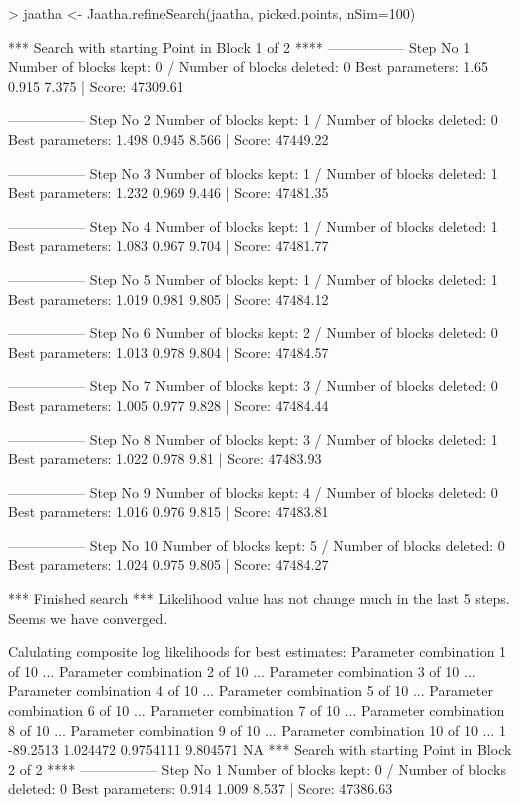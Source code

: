 
\begin{Schunk}
\begin{Sinput}
> jaatha <- Jaatha.refineSearch(jaatha, picked.points, nSim=100)
\end{Sinput}
\begin{Soutput}
*** Search with starting Point in Block 1 of 2 **** 
----------------- 
Step No 1 
Number of blocks kept: 0  / Number of blocks deleted: 0 
Best parameters:  1.65 0.915 7.375 | Score: 47309.61 

----------------- 
Step No 2 
Number of blocks kept: 1  / Number of blocks deleted: 0 
Best parameters:  1.498 0.945 8.566 | Score: 47449.22 

----------------- 
Step No 3 
Number of blocks kept: 1  / Number of blocks deleted: 1 
Best parameters:  1.232 0.969 9.446 | Score: 47481.35 

----------------- 
Step No 4 
Number of blocks kept: 1  / Number of blocks deleted: 1 
Best parameters:  1.083 0.967 9.704 | Score: 47481.77 

----------------- 
Step No 5 
Number of blocks kept: 1  / Number of blocks deleted: 1 
Best parameters:  1.019 0.981 9.805 | Score: 47484.12 

----------------- 
Step No 6 
Number of blocks kept: 2  / Number of blocks deleted: 0 
Best parameters:  1.013 0.978 9.804 | Score: 47484.57 

----------------- 
Step No 7 
Number of blocks kept: 3  / Number of blocks deleted: 0 
Best parameters:  1.005 0.977 9.828 | Score: 47484.44 

----------------- 
Step No 8 
Number of blocks kept: 3  / Number of blocks deleted: 1 
Best parameters:  1.022 0.978 9.81 | Score: 47483.93 

----------------- 
Step No 9 
Number of blocks kept: 4  / Number of blocks deleted: 0 
Best parameters:  1.016 0.976 9.815 | Score: 47483.81 

----------------- 
Step No 10 
Number of blocks kept: 5  / Number of blocks deleted: 0 
Best parameters:  1.024 0.975 9.805 | Score: 47484.27 

*** Finished search *** 
Likelihood value has not change much in the last 5 steps. 
Seems we have converged. 

Calulating composite log likelihoods for best estimates: 
Parameter combination 1 of 10 ... 
Parameter combination 2 of 10 ... 
Parameter combination 3 of 10 ... 
Parameter combination 4 of 10 ... 
Parameter combination 5 of 10 ... 
Parameter combination 6 of 10 ... 
Parameter combination 7 of 10 ... 
Parameter combination 8 of 10 ... 
Parameter combination 9 of 10 ... 
Parameter combination 10 of 10 ... 
1	-89.2513	1.024472	0.9754111	9.804571	NA	
*** Search with starting Point in Block 2 of 2 **** 
----------------- 
Step No 1 
Number of blocks kept: 0  / Number of blocks deleted: 0 
Best parameters:  0.914 1.009 8.537 | Score: 47386.63 


\end{Soutput}
\end{Schunk}
